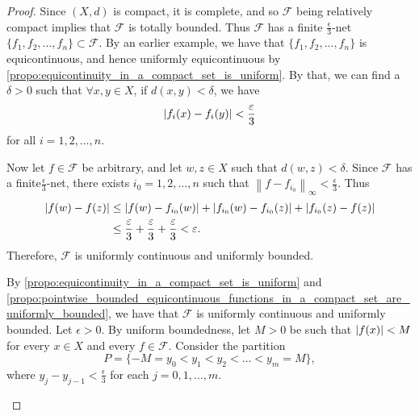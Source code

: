 \documentclass[notoc,notitlepage]{tufte-book}
\newcommand{\norm}[1]{\left\| #1 \right\|}
\begin{document}
\begin{proof}
   Since $(X, d)$ is compact, it is complete, and so $\mathcal{F}$ being relatively compact implies that $\mathcal{F}$ is totally bounded. Thus $\mathcal{F}$ has a finite $\frac{\epsilon}{3}$-net $\{ f_1, f_2, \ldots, f_n \} \subset \mathcal{F}$. By an earlier example, we have that $\{ f_1, f_2, \ldots, f_n \}$ is equicontinuous, and hence uniformly equicontinuous by \cref{propo:equicontinuity_in_a_compact_set_is_uniform}. By that, we can find a $\delta > 0$ such that $\forall x, y \in X$, if $d(x, y) < \delta$, we have
  \begin{equation*}
    \left| f_i(x) - f_i(y) \right| < \frac{\varepsilon}{3}
  \end{equation*}
  for all $i = 1, 2, \ldots, n$.

  Now let $f \in \mathcal{F}$ be arbitrary, and let $w, z \in X$ such that $d(w, z) < \delta$. Since $\mathcal{F}$ has a finite$\frac{\epsilon}{3}$-net, there exists $i_0 = 1, 2, \ldots, n$ such that $\norm{ f - f_{i_0} }_\infty < \frac{\epsilon}{3}$. Thus
  \begin{align*}
    \left| f(w) - f(z) \right| &\leq \left| f(w) - f_{i_0}(w) \right| + \left| f_{i_0}(w) - f_{i_0}(z) \right| + \left| f_{i_0}(z) - f(z) \right| \\
                        &\leq \frac{\varepsilon}{3} + \frac{\varepsilon}{3} + \frac{\varepsilon}{3} < \varepsilon.
  \end{align*}
  Therefore, $\mathcal{F}$ is uniformly continuous and uniformly bounded.

  \noindent
   By \cref{propo:equicontinuity_in_a_compact_set_is_uniform} and \cref{propo:pointwise_bounded_equicontinuous_functions_in_a_compact_set_are_uniformly_bounded}, we have that $\mathcal{F}$ is uniformly continuous and uniformly bounded. Let $\epsilon > 0$. By uniform boundedness, let $M > 0$ be such that $\left|f(x)\right| < M$ for every $x \in X$ and every $f \in \mathcal{F}$. Consider the partition
  \begin{equation*}
    P = \{ -M = y_0 < y_1 < y_2 < \ldots < y_m = M \},
  \end{equation*}
  where $y_j - y_{j - 1} < \frac{\epsilon}{3}$ for each $j = 0, 1, \ldots, m$.
  \begin{marginfigure}
    \centering
\end{marginfigure}
\end{proof}
\end{document}
